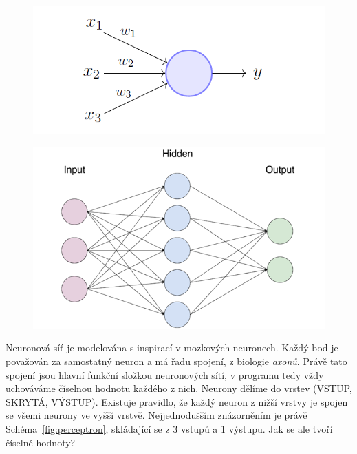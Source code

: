 \documentclass[a4paper,12pt]{article}
\begin{document}
        \begin{figure}[h]
        \centering
        \begin{minipage}{.5\textwidth}
            \centering
            \includegraphics[width=1.1\linewidth]{data/perceptron-model1.png}
            \label{fig:perceptron}
        \end{minipage}%
        \begin{minipage}{.5\textwidth}
            \centering
            \includegraphics[width=1.1\linewidth]{data/easynn-scheme.png}
            \label{fig:easynn}
        \end{minipage}
        \end{figure}

        Neuronová síť je modelována s inspirací v mozkových neuronech. Každý bod je považován za
        samostatný neuron a má řadu spojení, z biologie \textit{axonů}. Právě tato spojení jsou hlavní
        funkční složkou neuronových sítí, v programu tedy vždy uchováváme číselnou hodnotu každého z nich.
        Neurony dělíme do vrstev (VSTUP, SKRYTÁ, VÝSTUP). Existuje pravidlo, že každý neuron z nižší vrstvy 
        je spojen se všemi neurony ve vyšší vrstvě. Nejjednodušším znázorněním je 
        právě Schéma~\ref{fig:perceptron}, skládající se z 3 vstupů a 1 výstupu.
        Jak se ale tvoří číselné hodnoty?
\end{document}
